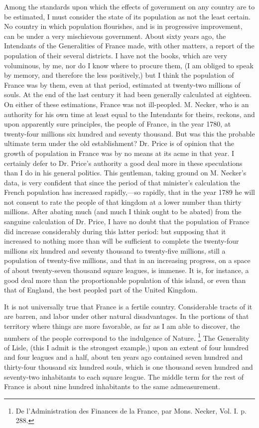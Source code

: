Among the standards upon which the effects of government on any country are to be estimated, I must consider the state of its population as not the least certain. No country in which population flourishes, and is in progressive improvement, can be under a very mischievous government. About sixty years ago, the Intendants of the Generalities of France made, with other matters, a report of the population of their several districts. I have not the books, which are very voluminous, by me, nor do I know where to procure them, (I am obliged to speak by memory, and therefore the less positively,) but I think the population of France was by them, even at that period, estimated at twenty-two millions of souls. At the end of the last century it had been generally calculated at eighteen. On either of these estimations, France was not ill-peopled. M. Necker, who is an authority for his own time at least equal to the Intendants for theirs, reckons, and upon apparently sure principles, the people of France, in the year 1780, at twenty-four millions six hundred and seventy thousand. But was this the probable ultimate term under the old establishment? Dr. Price is of opinion that the growth of population in France was by no means at its acme in that year. I certainly defer to Dr. Price's authority a good deal more in these speculations than I do in his general politics. This gentleman, taking ground on M. Necker's data, is very confident that since the period of that minister's calculation the French population has increased rapidly,—so rapidly, that in the year 1789 he will not consent to rate the people of that kingdom at a lower number than thirty millions. After abating much (and much I think ought to be abated) from the sanguine calculation of Dr. Price, I have no doubt that the population of France did increase considerably during this latter period: but supposing that it increased to nothing more than will be sufficient to complete the twenty-four millions six hundred and seventy thousand to twenty-five millions, still a population of twenty-five millions, and that in an increasing progress, on a space of about twenty-seven thousand square leagues, is immense. It is, for instance, a good deal more than the proportionable population of this island, or even than that of England, the best peopled part of the United Kingdom.

It is not universally true that France is a fertile country. Considerable tracts of it are barren, and labor under other natural disadvantages. In the portions of that territory where things are more favorable, as far as I am able to discover, the numbers of the people correspond to the indulgence of Nature.
\footnote{ De l'Administration des Finances de la France, par Mons. Necker, Vol. I. p. 288.}
 The Generality of Lisle, (this I admit is the strongest example,) upon an extent of four hundred and four leagues and a half, about ten years ago contained seven hundred and thirty-four thousand six hundred souls, which is one thousand seven hundred and seventy-two inhabitants to each square league. The middle term for the rest of France is about nine hundred inhabitants to the same admeasurement.

